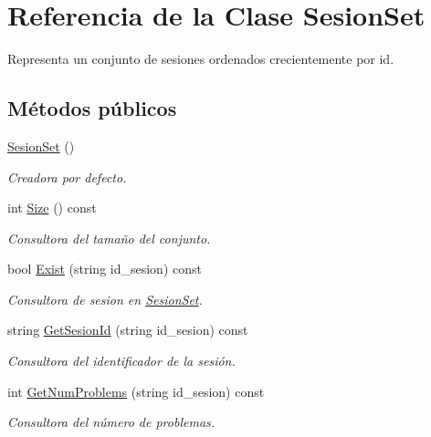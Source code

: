 \hypertarget{class_sesion_set}{}\section{Referencia de la Clase Sesion\+Set}
\label{class_sesion_set}


Representa un conjunto de sesiones ordenados crecientemente por id.  


\subsection*{Métodos públicos}
\begin{DoxyCompactItemize}
\item 
\mbox{\hyperlink{class_sesion_set_af583057121150fb193e71ae02e036bb0}{Sesion\+Set}} ()
\begin{DoxyCompactList}\small\item\em Creadora por defecto. \end{DoxyCompactList}\item 
int \mbox{\hyperlink{class_sesion_set_aa4cf0fbea2b9f9b6322390fc8b4a1b4c}{Size}} () const
\begin{DoxyCompactList}\small\item\em Consultora del tamaño del conjunto. \end{DoxyCompactList}\item 
bool \mbox{\hyperlink{class_sesion_set_a4e9002494d6532d3cdbd31172b8a08b0}{Exist}} (string id\+\_\+sesion) const
\begin{DoxyCompactList}\small\item\em Consultora de sesion en \mbox{\hyperlink{class_sesion_set}{Sesion\+Set}}. \end{DoxyCompactList}\item 
string \mbox{\hyperlink{class_sesion_set_a0c84ef607240e540fd1bcaec68280636}{Get\+Sesion\+Id}} (string id\+\_\+sesion) const
\begin{DoxyCompactList}\small\item\em Consultora del identificador de la sesión. \end{DoxyCompactList}\item 
int \mbox{\hyperlink{class_sesion_set_afeb85dad709e3fc5717e93c05a24bf8f}{Get\+Num\+Problems}} (string id\+\_\+sesion) const
\begin{DoxyCompactList}\small\item\em Consultora del número de problemas. \end{DoxyCompactList}\item 

\end{DoxyCompactItemize}
